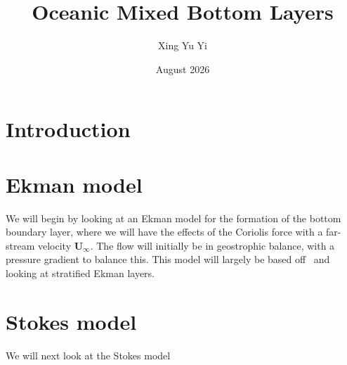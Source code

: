 \documentclass[12pt]{report}
\title{\textbf{Oceanic Mixed Bottom Layers}}
\author{Xing Yu Yi}
\date{August 2026}
\begin{document}
\maketitle

\hypersetup{
    linkcolor=black,
}
\tableofcontents
\hypersetup{
    linkcolor=blue,
}

\chapter{Introduction}
\label{intro}

\chapter{Ekman model}\label{chap:2}

We will begin by looking at an Ekman model for the formation of the bottom boundary layer, where we will have the effects of the Coriolis force with a far-stream velocity \(\mathbf{U}_\infty\). The flow will initially be in geostrophic balance, with a pressure gradient to balance this. This model will largely be based off~\cite{TaylorSarkar2008} and looking at stratified Ekman layers.



\chapter{Stokes model}\label{chap:3}

We will next look at the Stokes model

\printbibliography{}
\end{document}
